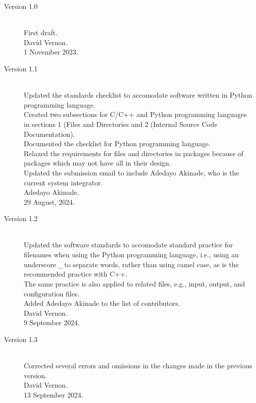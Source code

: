 \documentclass{CSSRforAfrica}
\begin{document}
\begin{description}

\item [Version 1.0]~\\
First draft. \\
David Vernon. \\                               
1 November 2023.      
 
\item [Version 1.1]~\\
Updated the standards checklist to accomodate software written in Python programming language. \\
Created two subsections for C/C++ and Python programming languages in sections 1 (Files and Directories and 2 (Internal Source Code Documentation).\\
Documented the checklist for Python programming language.\\
Relaxed the requirements for files and directories in packages because of packages which may not have all in their design. \\
Updated the submission email to include Adedayo Akinade, who is the current system integrator.\\
Adedayo Akinade. \\                               
29 August, 2024.   

\item [Version 1.2]~\\
Updated the software standards to accomodate standard practice for filenames when using the Python programming language, i.e., using an underscore {\small \verb+_+} to separate words, rather than using camel case, as is the recommended practice with C++.\\
The same practice is also applied to related files, e.g., input, output, and configuration files.\\
Added Adedayo Akinade to the list of contributors.\\     
David Vernon. \\       
9 September 2024. 

\item [Version 1.3]~\\
Corrected several errors and omissions in the changes made in the previous version.\\     
David Vernon. \\       
13 September 2024. 


\end{description}
\end{document}
